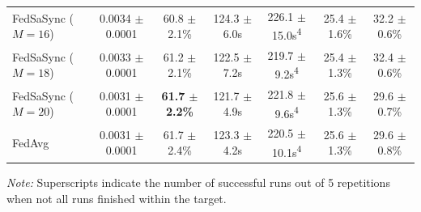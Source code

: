 \begin{table}[t]
{\begin{tabular}{lcccccc}
FedSaSync ($M = 16$) & 0.0034 $\pm$ 0.0001 & 60.8 $\pm$ 2.1\% & 124.3 $\pm$ 6.0s & 226.1 $\pm$ 15.0s\textsuperscript{4} & 25.4 $\pm$ 1.6\% & 32.2 $\pm$ 0.6\% \\
FedSaSync ($M = 18$) & 0.0033 $\pm$ 0.0001 & 61.2 $\pm$ 2.1\% & 122.5 $\pm$ 7.2s & 219.7 $\pm$ 9.2s\textsuperscript{4} & 25.4 $\pm$ 1.3\% & 32.4 $\pm$ 0.6\% \\
FedSaSync ($M = 20$) & 0.0031 $\pm$ 0.0001 & \textbf{61.7 $\pm$ 2.2\%} & 121.7 $\pm$ 4.9s & 221.8 $\pm$ 9.6s\textsuperscript{4} & 25.6 $\pm$ 1.3\% & 29.6 $\pm$ 0.7\% \\
FedAvg & 0.0031 $\pm$ 0.0001 & 61.7 $\pm$ 2.4\% & 123.3 $\pm$ 4.2s & 220.5 $\pm$ 10.1s\textsuperscript{4} & 25.6 $\pm$ 1.3\% & 29.6 $\pm$ 0.8\% \\
\hline
\end{tabular}%
}
\par\vspace{0.8em}
\raggedright \footnotesize \textit{Note:} Superscripts indicate the number of successful runs out of 5 repetitions when not all runs finished within the target.
\end{table}